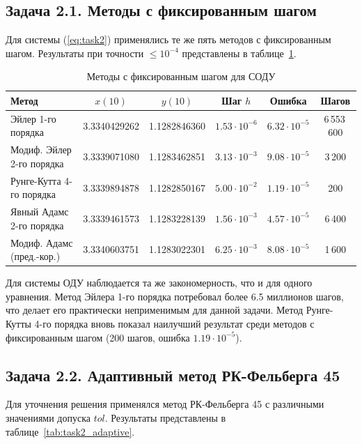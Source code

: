 \documentclass[a4paper]{article}
\begin{document}
\subsection*{Задача 2.1. Методы с фиксированным шагом}

Для системы (\ref{eq:task2}) применялись те же пять методов с фиксированным шагом. Результаты при точности $\le 10^{-4}$ представлены в таблице~\ref{tab:task2_fixed}.

\begin{table}[H]
\centering
\caption{Методы с фиксированным шагом для СОДУ}
\label{tab:task2_fixed}
\begin{tabular}{|l|c|c|c|c|c|}
\hline
\textbf{Метод} & \textbf{$x(10)$} & \textbf{$y(10)$} & \textbf{Шаг $h$} & \textbf{Ошибка} & \textbf{Шагов} \\
\hline
Эйлер 1-го порядка      & 3.3340429262 & 1.1282846360 & $1.53\cdot10^{-6}$ & $6.32\cdot10^{-5}$ & 6\,553\,600 \\
Модиф. Эйлер 2-го порядка & 3.3339071080 & 1.1283462851 & $3.13\cdot10^{-3}$ & $9.08\cdot10^{-5}$ & 3\,200 \\
Рунге-Кутта 4-го порядка  & 3.3339894878 & 1.1282850167 & $5.00\cdot10^{-2}$ & $1.19\cdot10^{-5}$ & 200 \\
Явный Адамс 2-го порядка  & 3.3339461573 & 1.1283228139 & $1.56\cdot10^{-3}$ & $4.57\cdot10^{-5}$ & 6\,400 \\
Модиф. Адамс (пред.-кор.) & 3.3340603751 & 1.1283022301 & $6.25\cdot10^{-3}$ & $8.08\cdot10^{-5}$ & 1\,600 \\
\hline
\end{tabular}
\end{table}

Для системы ОДУ наблюдается та же закономерность, что и для одного уравнения. Метод Эйлера 1-го порядка потребовал более 6.5 миллионов шагов, что делает его практически неприменимым для данной задачи. Метод Рунге-Кутты 4-го порядка вновь показал наилучший результат среди методов с фиксированным шагом (200 шагов, ошибка $1.19\cdot10^{-5}$).

\subsection*{Задача 2.2. Адаптивный метод РК-Фельберга 45}

Для уточнения решения применялся метод РК-Фельберга 45 с различными значениями допуска $tol$. Результаты представлены в таблице~\ref{tab:task2_adaptive}.
\end{document}
